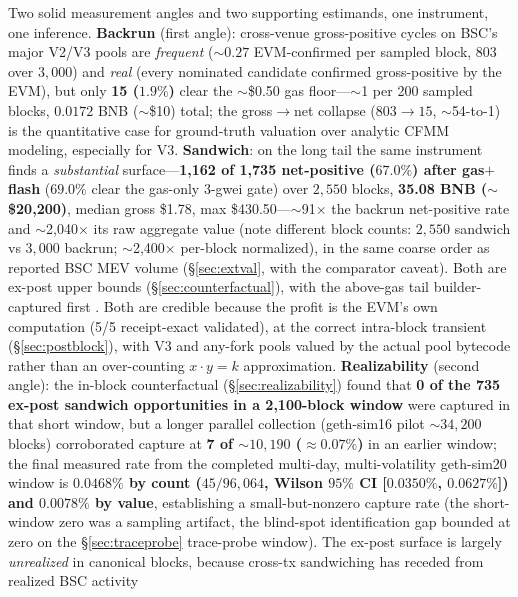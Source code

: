 \documentclass[11pt]{article}
\begin{document}
Two solid measurement angles and two supporting estimands, one instrument, one inference. \textbf{Backrun} (first angle):
cross-venue gross-positive cycles on BSC's major V2/V3 pools are \emph{frequent}
($\sim$$0.27$ EVM-confirmed per sampled block, $803$ over $3{,}000$) and \emph{real}
(every nominated candidate confirmed gross-positive by the EVM), but only \textbf{15
($1.9\%$)} clear the $\sim$\$0.50 gas floor---$\sim$1 per 200 sampled blocks, $0.0172$
BNB ($\sim$\$10) total; the gross$\to$net collapse ($803 \to 15$, $\sim$54-to-1) is
the quantitative case for ground-truth valuation over analytic CFMM modeling,
especially for V3. \textbf{Sandwich}: on the long tail the same instrument finds a
\emph{substantial} surface---\textbf{1{,}162 of 1{,}735 net-positive ($67.0\%$) after
gas$+$flash} ($69.0\%$ clear the gas-only 3-gwei gate) over $2{,}550$ blocks,
\textbf{35.08 BNB ($\sim$\$20{,}200)}, median gross \$1.78, max \$430.50---$\sim$91$\times$
the backrun net-positive rate and $\sim$2{,}040$\times$ its raw aggregate value (note
different block counts: $2{,}550$ sandwich vs $3{,}000$ backrun; $\sim$2{,}400$\times$
per-block normalized), in the same coarse order as reported BSC MEV volume
(\S\ref{sec:extval}, with the comparator caveat). Both are
ex-post upper bounds (\S\ref{sec:counterfactual}), with the above-gas tail
builder-captured first \cite{wang2025binance}. Both are
credible because the profit is the EVM's own computation (5/5 receipt-exact validated),
at the correct intra-block transient (\S\ref{sec:postblock}), with V3 and any-fork
pools valued by the actual pool bytecode rather than an over-counting $x\cdot y=k$
approximation. \textbf{Realizability} (second angle): the in-block
counterfactual (\S\ref{sec:realizability}) found that \textbf{0 of
the 735 ex-post sandwich opportunities in a 2{,}100-block window} were captured in that
short window, but a longer parallel collection (geth-sim16 pilot $\sim$$34{,}200$
blocks) corroborated capture at \textbf{7 of $\sim$$10{,}190$ ($\approx$$0.07\%$)} in an
earlier window; the final measured rate from the completed multi-day, multi-volatility geth-sim20 window is \textbf{$0.0468\%$ by count
($45/96{,}064$, Wilson $95\%$ CI [$0.0350\%$, $0.0627\%$]) and $0.0078\%$ by value}, establishing a small-but-nonzero capture rate (the short-window zero was a
sampling artifact, the blind-spot identification gap bounded at zero on the
\S\ref{sec:traceprobe} trace-probe window). The
ex-post surface is largely \emph{unrealized} in canonical blocks, because cross-tx
sandwiching has receded from realized BSC activity
\end{document}
